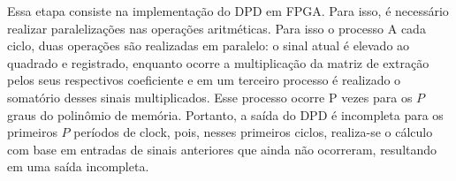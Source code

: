 Essa etapa consiste na implementação do DPD em FPGA. Para isso, é necessário realizar paralelizações nas operações aritméticas. Para isso o processo  A cada ciclo, duas operações são realizadas em paralelo: o sinal atual é elevado ao quadrado e registrado, enquanto ocorre a multiplicação da matriz de extração pelos seus respectivos coeficiente e em um terceiro processo é realizado o somatório desses sinais multiplicados. Esse processo ocorre P vezes para os \( P \) graus do polinômio de memória. Portanto, a saída do DPD é incompleta para os primeiros \( P \) períodos de clock, pois, nesses primeiros ciclos, realiza-se o cálculo com base em entradas de sinais anteriores que ainda não ocorreram, resultando em uma saída incompleta.


